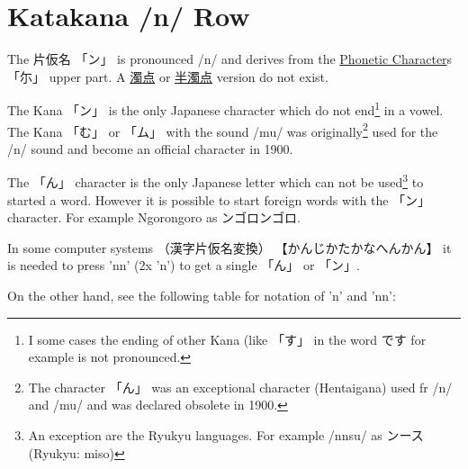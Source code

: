 \section{Katakana /n/ Row}\label{sec:KatakanaNrow}


 The  片仮名 {「ン」} is pronounced  /n/ and  derives from the
\hyperref[sec:PhoneticCharacter]{Phonetic Character}s {「尓」} upper part.  A
\hyperref[sec:Dakuten]{濁点} or \hyperref[sec:Handakuten]{半濁点} version do
not exist.


The Kana {「ン」}  is the only Japanese character which do not end\footnote{ I
some cases the ending of other Kana (like {「す」} in the word {です} for
example is not pronounced.} in a vowel. The Kana {「む」} or {「ム」} with the
sound /mu/ was originally\footnote{ The character {「ん」} was an exceptional
character (Hentaigana) used fr /n/ and /mu/ and was declared obsolete in 1900.}
used for the /n/ sound and become an official character in 1900. 

The {「ん」} character is the only Japanese letter which can not be
used\footnote{An exception are the Ryukyu languages. For example /nnsu/ as
ンース (Ryukyu: miso) } to started a word. However it is possible to start
foreign words with the {「ン」} character. For example Ngorongoro as
ンゴロンゴロ. 

In some computer systems {（漢字片仮名変換）} {【かんじかたかなへんかん】} it
is needed to press 'nn' (2x 'n') to get a single {「ん」} or {「ン」}.

On the other hand, see the following table for notation of 'n' and 'nn':
\bigskip





